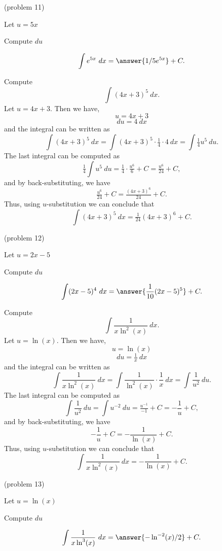 \documentclass[handout]{ximera}
\begin{document}
\begin{problem}(problem 11)
\begin{hint}
Let $u = 5x$
\end{hint}
\begin{hint}
Compute $du$
\end{hint}
\[\int e^{5x} \ dx = \answer{1/5 e^{5x}} +C.\]
\end{problem}


\begin{example}[example 12] Compute 
\[\int (4x+3)^5 \ dx.\]
Let $u = 4x+3$. Then we have,
\[u = 4x+3\]
\[du = 4 \ dx\]
and the integral can be written as 
\[\int (4x+3)^5 \ dx =   \int (4x+3)^5 \cdot \tfrac14\cdot 4  \   dx =   \int \tfrac14 u^5 \ du.\]
The last integral can be computed as 
\[\tfrac14  \int u^5 \ du = \tfrac14  \cdot \tfrac{u^6}{6} + C = \tfrac{u^6}{24} + C,\]
and by back-substituting, we have 
\[\tfrac{u^6}{24} + C = \tfrac{(4x+3)^6}{24}+ C.\]
Thus, using $u$-substitution we can conclude that
\[\int (4x+3)^5 \ dx = \tfrac{1}{24}(4x+3)^6 + C.\]
\end{example}




\begin{problem}(problem 12)
\begin{hint}
Let $u = 2x - 5$
\end{hint}
\begin{hint}
Compute $du$
\end{hint}
\[\int (2x - 5)^4 \ dx = \answer{\frac{1}{10}(2x-5)^5} +C.\]
\end{problem}


\begin{example}[example 13] Compute 
\[\int \frac{1}{x\ln^2(x)} \ dx.\]
Let $u = \ln(x)$. Then we have,
\[u = \ln(x)\]
\[du = \tfrac1x \ dx\]
and the integral can be written as 
\[\int \frac{1}{x\ln^2(x)} \ dx = \int \frac{1}{\ln^2(x)} \cdot \frac{1}{x}\  dx = \int \frac{1}{u^2} \ du.\]
The last integral can be computed as 
\[\int \frac{1}{u^2} \ du = \int u^{-2} \ du = \tfrac{u^{-1}}{-1} + C 
= -\frac{1}{u} + C,\]
and by back-substituting, we have 
\[-\frac{1}{u} + C =  -\frac{1}{\ln(x)} + C.\]
Thus, using $u$-substitution we can conclude that
\[\int \frac{1}{x\ln^2(x)} \ dx =  -\frac{1}{\ln(x)} + C.\]
\end{example}


\begin{problem}(problem 13)
\begin{hint}
Let $u = \ln(x)$
\end{hint}
\begin{hint}
Compute $du$
\end{hint}
\[\int \frac{1}{x\ln^3(x)} \ dx = \answer{- \ln^{-2}(x)/2} +C.\]
\end{problem}
\end{document}

